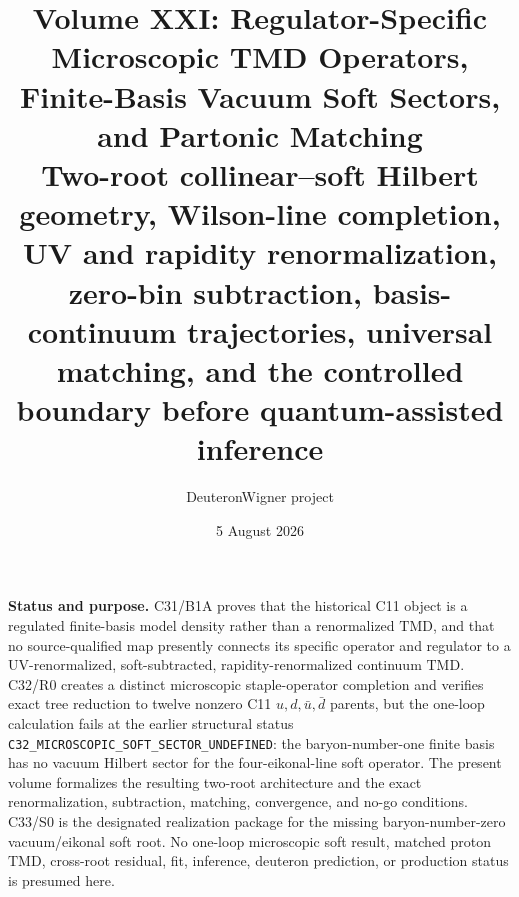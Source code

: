 \documentclass[11pt]{article}
\title{\vspace{-1.0cm}
{\color{navy}\bfseries Volume XXI: Regulator-Specific Microscopic TMD Operators,\\[2mm]
Finite-Basis Vacuum Soft Sectors, and Partonic Matching\\[4mm]
\large Two-root collinear--soft Hilbert geometry, Wilson-line completion, UV and rapidity renormalization,\\
zero-bin subtraction, basis-continuum trajectories, universal matching, and the controlled boundary before quantum-assisted inference}}
\author{DeuteronWigner project}
\date{5 August 2026}
\newcommand{\TMD}{\ensuremath{\mathrm{TMD}}}
\begin{document}
\maketitle

\begin{center}
\begin{minipage}{0.94\textwidth}
\colorbox{softblue}{\parbox{0.96\textwidth}{
\textbf{Status and purpose.}
C31/B1A proves that the historical C11 object is a regulated finite-basis model density rather than a renormalized \TMD, and that no source-qualified map presently connects its specific operator and regulator to a UV-renormalized, soft-subtracted, rapidity-renormalized continuum \TMD.  C32/R0 creates a distinct microscopic staple-operator completion and verifies exact tree reduction to twelve nonzero C11 \(u,d,\bar u,\bar d\) parents, but the one-loop calculation fails at the earlier structural status \texttt{C32\_MICROSCOPIC\_SOFT\_SECTOR\_UNDEFINED}: the baryon-number-one finite basis has no vacuum Hilbert sector for the four-eikonal-line soft operator.  The present volume formalizes the resulting two-root architecture and the exact renormalization, subtraction, matching, convergence, and no-go conditions.  C33/S0 is the designated realization package for the missing baryon-number-zero vacuum/eikonal soft root.  No one-loop microscopic soft result, matched proton \TMD, cross-root residual, fit, inference, deuteron prediction, or production status is presumed here.
}}
\end{minipage}
\end{center}
\end{document}
